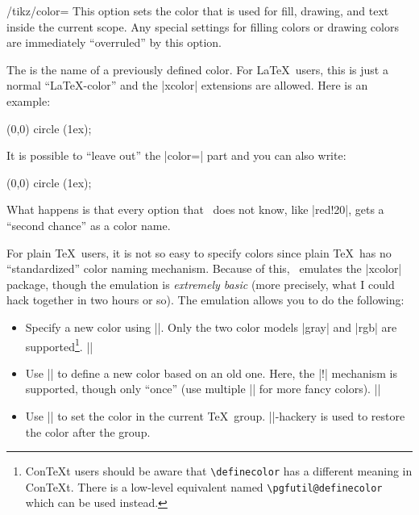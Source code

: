 \begin{key}{/tikz/color=}
  This option sets the color that is used for fill, drawing, and text
  inside the current scope. Any special settings for filling colors or
  drawing colors are immediately ``overruled'' by this option.

  The  is the name of a previously defined color. For
  \LaTeX\ users, this is just a normal ``\LaTeX-color'' and the
  |xcolor| extensions are allowed. Here is an example:

\begin{codeexample}[]
\tikz \fill[color=red!20] (0,0) circle (1ex);
\end{codeexample}

  It is possible to ``leave out'' the |color=| part and you can also
  write:
\begin{codeexample}[]
\tikz \fill[red!20] (0,0) circle (1ex);
\end{codeexample}
  What happens is that every option that \tikzname\ does not know, like
  |red!20|, gets a ``second chance'' as a color name.

  For plain \TeX\ users, it is not so easy to specify colors since
  plain \TeX\ has no ``standardized'' color naming
  mechanism. Because of this, \pgfname\ emulates the |xcolor| package,
  though the emulation is \emph{extremely basic} (more precisely, what
  I could hack together in two hours or so). The emulation allows you
  to do the following:
  \begin{itemize}
  \item Specify a new color using |\definecolor|. Only the two color
    models |gray| and |rgb| are supported\footnote{Con\TeX t users should be aware that \texttt{\textbackslash definecolor} has a different meaning in Con\TeX t. There is a low-level equivalent named \texttt{\textbackslash pgfutil@definecolor} which can be used instead.}.%
    \example ||
  \item Use || to define a new color based on an old
    one. Here, the |!| mechanism is supported, though only ``once''
    (use multiple || for more fancy colors).
    \example ||
  \item Use |\color| to set the color in the current
    \TeX\ group. |\aftergroup|-hackery is used to restore the color
    after the group.
  \end{itemize}
\end{key}

